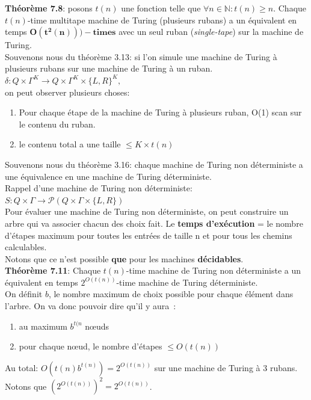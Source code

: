 \documentclass[a4paper,12pt]{article}
\begin{document}
  \textbf{Théorème 7.8}: posons $t(n)$ une fonction telle que $\forall n \in \mathbb N : t(n) \geq n$.
	Chaque $t(n)$-time multitape machine de Turing (plusieurs rubans) a un équivalent en temps $\mathbf{O(t^2(n)))-times}$ avec un seul ruban (\textit{single-tape}) sur la machine de Turing.\\
  Souvenons nous du théorème 3.13: si l'on simule une machine de Turing à plusieurs rubans sur une machine de Turing à un ruban.
	$\delta : Q \times \Gamma^K \rightarrow Q \times \Gamma^K \times \{L, R\}^K,$\\
  on peut observer plusieurs choses:
  \begin{enumerate}
   \item Pour chaque étape de la machine de Turing à plusieurs ruban, O(1) scan sur le contenu du ruban.
   \item le contenu total a une taille $\leq K \times t(n)$
  \end{enumerate}

  Souvenons nous du théorème 3.16: chaque machine de Turing non déterministe a une équivalence en une machine de Turing déterministe.\\
  Rappel d'une machine de Turing non déterministe: $S:Q \times \Gamma \rightarrow \mathcal P(Q \times \Gamma \times \{L, R\})$\\
  Pour évaluer une machine de Turing non déterministe, on peut construire un arbre qui va associer chacun des choix fait. Le \textbf{temps d'exécution} = le nombre d'étapes maximum pour toutes les entrées de taille n et pour tous les chemins calculables.\\
  Notons que ce n'est possible \textbf{que} pour les machines \textbf{décidables}.\\
  \textbf{Théorème 7.11}: Chaque $t(n)$-time machine de Turing non déterministe a un équivalent en temps $2^{O(t(n))}$-time machine de Turing déterministe.\\
  On définit $b$, le nombre maximum de choix possible pour chaque élément dans l'arbre. On va donc pouvoir dire qu'il y aura~:
  \begin{enumerate}
   \item au maximum $b^{t(n}$ nœuds
   \item pour chaque nœud, le nombre d'étapes $\leq O(t(n))$
  \end{enumerate}
  Au total: $O(t(n) b^{t(n)}) = 2^{O(t(n))}$ sur une machine de Turing à 3 rubans.\\
  Notons que $(2^{O(t(n))})^2 = 2^{O(t(n))}$.\\
\end{document}
